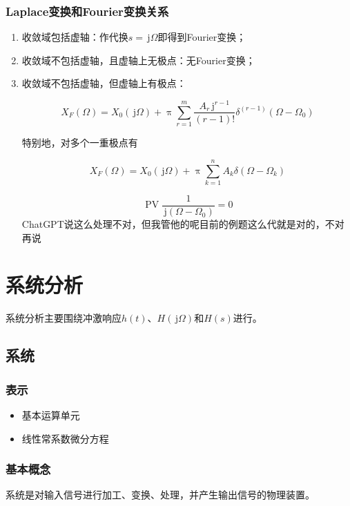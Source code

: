 \documentclass[UTF8,fontset=fandol,zihao=5]{ctexart}
\newcommand{\jj}{\,\mathrm{j}}
\begin{document}
\subsubsection{Laplace变换和Fourier变换关系}

\begin{enumerate}
  \item 收敛域包括虚轴：作代换$s=\jj\varOmega$即得到Fourier变换；
  \item 收敛域不包括虚轴，且虚轴上无极点：无Fourier变换；
  \item 收敛域不包括虚轴，但虚轴上有极点：

  \[
  X_F(\varOmega)=X_0(\jj\varOmega)
  +\uppi\sum_{r=1}^{m}
  \frac{A_r\jj^{r-1}}{(r-1)!}
  \delta^{(r-1)}(\varOmega-\varOmega_0)
  \]

  特别地，对多个一重极点有

  \[
  X_F(\varOmega)=X_0(\jj\varOmega)
  +\uppi\sum_{k=1}^{n}A_k\delta(\varOmega-\varOmega_k)
  \]

  \begin{methodbox}[【技巧】一重极点柯西主值]
    \[
    \operatorname{PV}\frac{1}{\jj(\varOmega-\varOmega_0)}=0
    \]
    ChatGPT说这么处理不对，但我管他的呢目前的例题这么代就是对的，不对再说
  \end{methodbox}
\end{enumerate}

\section{系统分析}

系统分析主要围绕冲激响应$h(t)$、$H(\jj \varOmega)$和$H(s)$进行。

\subsection{系统}

\subsubsection{表示}

\begin{itemize}
  \item 基本运算单元
  \item 线性常系数微分方程
\end{itemize}

\subsubsection{基本概念}
系统是对输入信号进行加工、变换、处理，并产生输出信号的物理装置。
\end{document}

